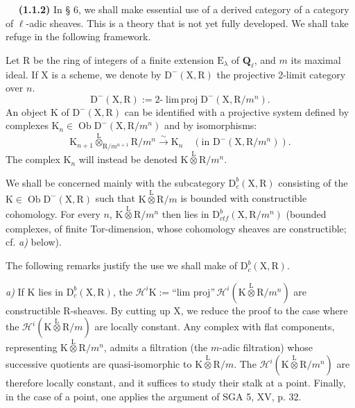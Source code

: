 \documentclass[11pt,leqno]{article}
\newcommand{\Page}[1]{\ifvmode\noindent\else\unskip\ \fi{\footnotesize\textcolor{gray}{[p.\,#1]}}\ \ignorespaces}
\begin{document}
\Page{148}
\textbf{(1.1.2)} In § 6, we shall make essential use of a derived category of a category of \(\ell\)-adic sheaves. This is a theory that is not yet fully developed. We shall take refuge in the following framework.

Let \(\mathrm{R}\) be the ring of integers of a finite extension \(\mathrm{E}_\lambda\) of \(\mathbf{Q}_\ell\), and \(m\) its maximal ideal. If \(\mathrm{X}\) is a scheme, we denote by \(\mathrm{D}^-(\mathrm{X},\mathrm{R})\) the projective 2-limit category over \(n\).
\[
\mathrm{D}^-(\mathrm{X},\mathrm{R})
:=2\text{-}\operatorname{lim\,proj}\mathrm{D}^-(\mathrm{X},\mathrm{R}/m^n).
\]
An object \(\mathrm{K}\) of \(\mathrm{D}^-(\mathrm{X},\mathrm{R})\) can be identified with a projective system defined by complexes \(\mathrm{K}_n\in\operatorname{Ob}\mathrm{D}^-(\mathrm{X},\mathrm{R}/m^n)\) and by isomorphisms:
\[
\mathrm{K}_{n+1}\overset{\mathrm{L}}{\otimes}_{\mathrm{R}/m^{n+1}}\mathrm{R}/m^n
\overset{\sim}{\to}\mathrm{K}_n
\quad
(\text{in }\mathrm{D}^-(\mathrm{X},\mathrm{R}/m^n)).
\]
The complex \(\mathrm{K}_n\) will instead be denoted \(\mathrm{K}\overset{\mathrm{L}}{\otimes}\mathrm{R}/m^n\).

We shall be concerned mainly with the subcategory \(\mathrm{D}_c^b(\mathrm{X},\mathrm{R})\) consisting of the \(\mathrm{K}\in\operatorname{Ob}\mathrm{D}^-(\mathrm{X},\mathrm{R})\) such that \(\mathrm{K}\overset{\mathrm{L}}{\otimes}\mathrm{R}/m\) is bounded with constructible cohomology. For every \(n\), \(\mathrm{K}\overset{\mathrm{L}}{\otimes}\mathrm{R}/m^n\) then lies in \(\mathrm{D}_{\mathit{ctf}}^b(\mathrm{X},\mathrm{R}/m^n)\) (bounded complexes, of finite Tor-dimension, whose cohomology sheaves are constructible; cf. \textit{a)} below).

The following remarks justify the use we shall make of \(\mathrm{D}_c^b(\mathrm{X},\mathrm{R})\).

\textit{a)} If \(\mathrm{K}\) lies in \(\mathrm{D}_c^b(\mathrm{X},\mathrm{R})\), the \(\mathscr{H}^i\mathrm{K}:=\text{“lim proj”}\,\mathscr{H}^i(\mathrm{K}\overset{\mathrm{L}}{\otimes}\mathrm{R}/m^n)\) are constructible \(\mathrm{R}\)-sheaves. By cutting up \(\mathrm{X}\), we reduce the proof to the case where the \(\mathscr{H}^i(\mathrm{K}\overset{\mathrm{L}}{\otimes}\mathrm{R}/m)\) are locally constant. Any complex with flat components, representing \(\mathrm{K}\overset{\mathrm{L}}{\otimes}\mathrm{R}/m^n\), admits a filtration (the \(m\)-adic filtration) whose successive quotients are quasi-isomorphic to \(\mathrm{K}\overset{\mathrm{L}}{\otimes}\mathrm{R}/m\). The \(\mathscr{H}^i(\mathrm{K}\overset{\mathrm{L}}{\otimes}\mathrm{R}/m^n)\) are therefore locally constant, and it suffices to study their stalk at a point. Finally, in the case of a point, one applies the argument of SGA 5, XV, p. 32.
\end{document}

